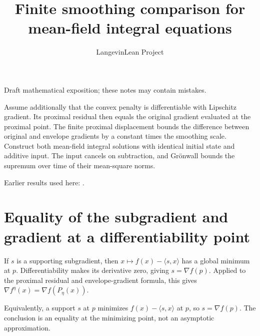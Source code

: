 \documentclass[11pt,a4paper]{article}
\title{\texorpdfstring{Finite smoothing comparison for mean-field integral equations}{Finite smoothing comparison for mean-field integral equations}}
\author{LangevinLean Project}
\date{}
\begin{document}
\maketitle
Draft mathematical exposition; these notes may contain mistakes.


Assume additionally that the convex penalty is differentiable with Lipschitz gradient. Its proximal residual then equals the original gradient evaluated at the proximal point. The finite proximal displacement bounds the difference between original and envelope gradients by a constant times the smoothing scale. Construct both mean-field integral solutions with identical initial state and additive input. The input cancels on subtraction, and Grönwall bounds the supremum over time of their mean-square norms.




Earlier results used here: \cite[Section~3.43]{LangevinLean2026ULASC}.

\section{\texorpdfstring{Equality of the subgradient and gradient at a differentiability point}{Equality of the subgradient and gradient at a differentiability point}}


If \(s\) is a supporting subgradient, then \(x\mapsto f(x)-\langle s,x\rangle\) has a global minimum at \(p\). Differentiability makes its derivative zero, giving \(s=\nabla f(p)\). Applied to the proximal residual and envelope-gradient formula, this gives \(\nabla f^\eta(x)=\nabla f(P_\eta(x))\).



Equivalently, a support \(s\) at \(p\) minimizes \(f(x)-\langle s,x\rangle\) at \(p\), so \(s=\nabla f(p)\). The conclusion is an equality at the minimizing point, not an asymptotic approximation.
\end{document}
